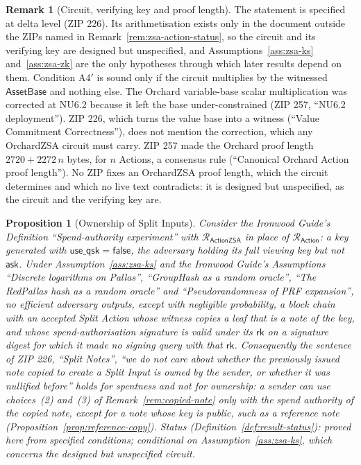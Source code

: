 \documentclass[11pt,a4paper]{article}
\newtheorem{proposition}[theorem]{Proposition}
\theoremstyle{definition}
\newtheorem{remark}[theorem]{Remark}
\newcommand{\Rel}{\mathcal{R}}
\newcommand{\rk}{\mathsf{rk}}
\newcommand{\ask}{\ensuremath{\mathsf{ask}}}
\begin{document}
\begin{remark}[Circuit, verifying key and proof length]
\label{rem:zsa-proof-status}
The statement is specified at delta level (ZIP 226). Its arithmetisation
exists only in the document outside the ZIPs named in
Remark~\ref{rem:zsa-action-status}, so the circuit and its verifying key
are designed but unspecified, and Assumptions~\ref{ass:zsa-ks}
and~\ref{ass:zsa-zk} are the only hypotheses through which later results
depend on them. Condition A4$'$ is sound only if the circuit multiplies by
the witnessed $\mathsf{AssetBase}$ and nothing else. The Orchard
variable-base scalar multiplication was corrected at NU6.2 because it left
the base under-constrained (ZIP 257, ``NU6.2 deployment''). ZIP 226, which
turns the value base into a witness (``Value Commitment Correctness''),
does not mention the correction, which any OrchardZSA circuit must carry.
ZIP 257 made the Orchard proof length $2720 + 2272\,n$ bytes, for $n$
Actions, a consensus rule (``Canonical Orchard Action proof length''). No
ZIP fixes an OrchardZSA proof length, which the circuit determines and
which no live text contradicts: it is designed but unspecified, as the
circuit and the verifying key are.
\end{remark}

\begin{proposition}[Ownership of Split Inputs]\label{prop:split-ownership}
Consider the \emph{Ironwood Guide}'s Definition ``Spend-authority
experiment'' with $\Rel_{\mathsf{ActionZSA}}$ in place of
$\Rel_{\mathsf{Action}}$: a key generated with
$\mathsf{use\_qsk} = \mathsf{false}$, the adversary holding its full viewing
key but not $\ask$. Under Assumption~\ref{ass:zsa-ks} and the
\emph{Ironwood Guide}'s Assumptions ``Discrete logarithms on Pallas'',
``GroupHash as a random oracle'', ``The RedPallas hash as a random oracle''
and ``Pseudorandomness of PRF expansion'', no efficient adversary outputs,
except with negligible probability, a block chain with an accepted Split
Action whose witness copies a leaf that is a note of the key, and whose
spend-authorisation signature is valid under its $\rk$ on a signature
digest for which it made no signing query with that $\rk$. Consequently the
sentence of ZIP 226, ``Split Notes'', ``we do not care about whether the
previously issued note copied to create a Split Input is owned by the
sender, or whether it was nullified before'' holds for spentness and not
for ownership: a sender can use choices~(2) and~(3) of
Remark~\ref{rem:copied-note} only with the spend authority of the copied
note, except for a note whose key is public, such as a reference note
(Proposition~\ref{prop:reference-copy}). Status
(Definition~\ref{def:result-status}): proved here from specified
conditions; conditional on Assumption~\ref{ass:zsa-ks}, which concerns the
designed but unspecified circuit.
\end{proposition}
\end{document}
